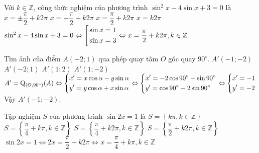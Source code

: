 \begin{ex}%
 Với $ k \in \mathbb{Z}$, công thức nghiệm của phương trình $\sin^2 x-4 \sin x + 3 = 0$ là
 \choice
  {$x =\pm \dfrac{\pi}{2}+k2\pi$}
  {$x = -\dfrac{\pi}{2}+k2\pi$}
  {\True $x = \dfrac{\pi}{2}+k2\pi$}
  {$x = k2\pi$}
 \loigiai
 {
 $\sin^2 x-4 \sin x + 3 = 0 \Leftrightarrow \left[\begin{aligned}& \sin x = 1 \\& \sin x = 3\end{aligned}\right. \Leftrightarrow x = \dfrac{\pi}{2}+k2\pi , k\in \mathbb{Z}$
}
\end{ex}


\begin{ex}%
 Tìm ảnh của điểm $A(-2;1)$ qua phép quay tâm $O$ góc quay $90^{\circ}$.
 \choice
  {\True $A'(-1;-2)$}
  {$A'(-2;1)$}
  {$A'(1;2)$}
  {$A'(1;-2)$}
 \loigiai
 {
 $A'=\mathrm{Q}_{\left(O,90^{\circ}\right)}(A)\Leftrightarrow \left\{\begin{aligned}&x'=x\cos{\alpha}-y\sin{\alpha} \\&y'=y\cos{\alpha}+x\sin{\alpha}\end{aligned}\right. \Leftrightarrow \left\{\begin{aligned}&x'=-2\cos{90^{\circ}}-\sin{90^{\circ}} \\&y'=\cos{90^{\circ}}-2\sin{90^{\circ}}\end{aligned}\right. \Leftrightarrow \left\{\begin{aligned}&x'=-1 \\&y'=-2\end{aligned}\right. $\\
 Vậy $A'(-1;-2)$.
 }
\end{ex}

\begin{ex}%
 Tập nghiệm $S$ của phương trình $\sin{2x} = 1$ là
 \choice
  {$S=\left\{k \pi , k \in \mathbb{Z}\right\}$}
  {\True $S=\left\{\dfrac{\pi}{4}+k\pi, k \in \mathbb{Z}\right\}$}
  {$S=\left\{\dfrac{\pi}{4}+k2\pi, k \in \mathbb{Z}\right\}$}
  {$S=\left\{\dfrac{\pi}{2}+k2\pi, k \in \mathbb{Z}\right\}$}
 \loigiai
 {
 $\sin2x = 1 \Leftrightarrow 2x = \dfrac{\pi}{2}+k2 \pi \Leftrightarrow x = \dfrac{\pi}{4}+k\pi,k \in \mathbb{Z}$ 
 }
\end{ex}

